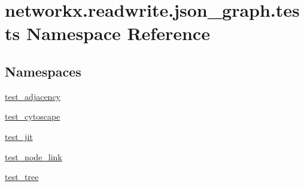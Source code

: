 \hypertarget{namespacenetworkx_1_1readwrite_1_1json__graph_1_1tests}{}\section{networkx.\+readwrite.\+json\+\_\+graph.\+tests Namespace Reference}
\label{namespacenetworkx_1_1readwrite_1_1json__graph_1_1tests}
\subsection*{Namespaces}
\begin{DoxyCompactItemize}
\item 
 \hyperlink{namespacenetworkx_1_1readwrite_1_1json__graph_1_1tests_1_1test__adjacency}{test\+\_\+adjacency}
\item 
 \hyperlink{namespacenetworkx_1_1readwrite_1_1json__graph_1_1tests_1_1test__cytoscape}{test\+\_\+cytoscape}
\item 
 \hyperlink{namespacenetworkx_1_1readwrite_1_1json__graph_1_1tests_1_1test__jit}{test\+\_\+jit}
\item 
 \hyperlink{namespacenetworkx_1_1readwrite_1_1json__graph_1_1tests_1_1test__node__link}{test\+\_\+node\+\_\+link}
\item 
 \hyperlink{namespacenetworkx_1_1readwrite_1_1json__graph_1_1tests_1_1test__tree}{test\+\_\+tree}
\end{DoxyCompactItemize}
